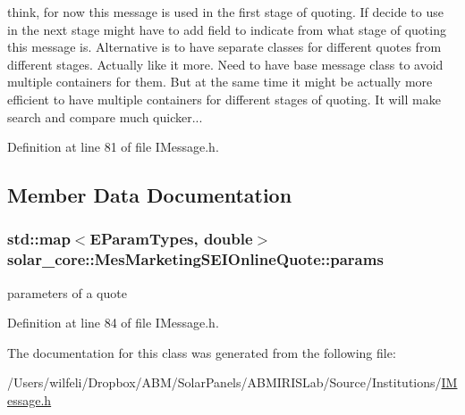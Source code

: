 think, for now this message is used in the first stage of quoting. If decide to use in the next stage might have to add field to indicate from what stage of quoting this message is. Alternative is to have separate classes for different quotes from different stages. Actually like it more. Need to have base message class to avoid multiple containers for them. But at the same time it might be actually more efficient to have multiple containers for different stages of quoting. It will make search and compare much quicker... 

Definition at line 81 of file I\+Message.\+h.



\subsection{Member Data Documentation}
\hypertarget{classsolar__core_1_1_mes_marketing_s_e_i_online_quote_a985cbf3eb866c4488f0de003c4090aaf}{}
\subsubsection[{params}]{\setlength{\rightskip}{0pt plus 5cm}std\+::map$<${\bf E\+Param\+Types}, double$>$ solar\+\_\+core\+::\+Mes\+Marketing\+S\+E\+I\+Online\+Quote\+::params}\label{classsolar__core_1_1_mes_marketing_s_e_i_online_quote_a985cbf3eb866c4488f0de003c4090aaf}
parameters of a quote 

Definition at line 84 of file I\+Message.\+h.



The documentation for this class was generated from the following file\+:\begin{DoxyCompactItemize}
\item 
/\+Users/wilfeli/\+Dropbox/\+A\+B\+M/\+Solar\+Panels/\+A\+B\+M\+I\+R\+I\+S\+Lab/\+Source/\+Institutions/\hyperlink{_i_message_8h}{I\+Message.\+h}\end{DoxyCompactItemize}

